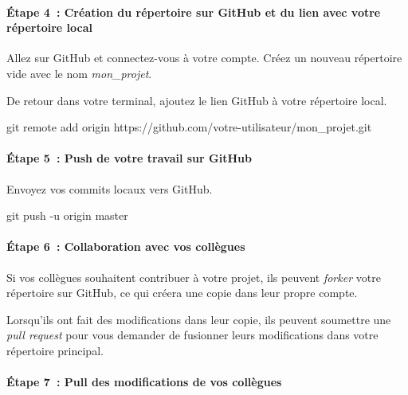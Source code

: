 \documentclass[
  letterpaper,
  DIV=11,
  numbers=noendperiod]{scrreprt}
\let\oldparagraph\paragraph
\renewcommand{\paragraph}[1]{\oldparagraph{#1}\mbox{}}
\newenvironment{Shaded}{\begin{snugshade}}{\end{snugshade}}
\newcommand{\AttributeTok}[1]{\textcolor[rgb]{0.40,0.45,0.13}{#1}}
\newcommand{\FunctionTok}[1]{\textcolor[rgb]{0.28,0.35,0.67}{#1}}
\newcommand{\NormalTok}[1]{\textcolor[rgb]{0.00,0.23,0.31}{#1}}
\begin{document}
\paragraph{Étape 4~: Création du répertoire sur GitHub et du lien avec
votre répertoire
local}\label{uxe9tape-4-cruxe9ation-du-ruxe9pertoire-sur-github-et-du-lien-avec-votre-ruxe9pertoire-local}

Allez sur GitHub et connectez-vous à votre compte. Créez un nouveau
répertoire vide avec le nom \emph{mon\_projet}.

De retour dans votre terminal, ajoutez le lien GitHub à votre répertoire
local.

\begin{Shaded}
\begin{Highlighting}[]
\FunctionTok{git}\NormalTok{ remote add origin https://github.com/votre{-}utilisateur/mon\_projet.git}
\end{Highlighting}
\end{Shaded}

\paragraph{Étape 5~: Push de votre travail sur
GitHub}\label{uxe9tape-5-push-de-votre-travail-sur-github}

Envoyez vos commits locaux vers GitHub.

\begin{Shaded}
\begin{Highlighting}[]
\FunctionTok{git}\NormalTok{ push }\AttributeTok{{-}u}\NormalTok{ origin master}
\end{Highlighting}
\end{Shaded}

\paragraph{Étape 6~: Collaboration avec vos
collègues}\label{uxe9tape-6-collaboration-avec-vos-colluxe8gues}

Si vos collègues souhaitent contribuer à votre projet, ils peuvent
\emph{forker} votre répertoire sur GitHub, ce qui créera une copie dans
leur propre compte.

Lorsqu'ils ont fait des modifications dans leur copie, ils peuvent
soumettre une \emph{pull request} pour vous demander de fusionner leurs
modifications dans votre répertoire principal.

\paragraph{Étape 7~: Pull des modifications de vos
collègues}\label{uxe9tape-7-pull-des-modifications-de-vos-colluxe8gues}
\end{document}
